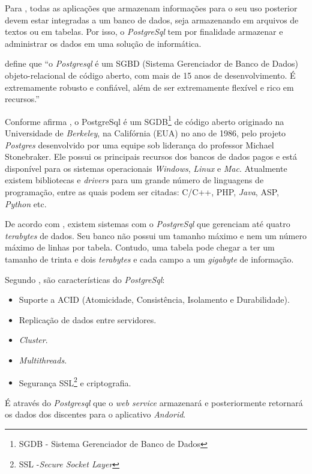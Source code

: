 
	\par Para , todas as aplicações que armazenam
informações para o seu uso posterior devem estar integradas a um banco de
dados, seja armazenando em arquivos de textos ou em tabelas. Por isso, o
\textit{PostgreSql} tem por finalidade armazenar e administrar os dados em uma
solução de informática.
	
	\par {} define que “o \textit{Postgresql} é
um SGBD (Sistema Gerenciador de Banco de Dados) objeto-relacional de código
aberto, com mais de 15 anos de desenvolvimento. É extremamente robusto e
confiável, além de ser extremamente flexível e rico em recursos.” 

	\par Conforme afirma , o PostgreSql é um
SGDB\footnote{SGDB - Sistema Gerenciador de Banco de Dados } de código aberto
originado na Universidade de \textit{Berkeley}, na Califórnia (EUA) no ano de
1986, pelo projeto \textit{Postgres} desenvolvido por uma equipe sob liderança
do professor Michael Stonebraker. Ele possui os principais recursos dos bancos
de dados pagos e está disponível para os sistemas operacionais
\textit{Windows}, \textit{Linux} e \textit{Mac}. Atualmente existem bibliotecas
e \textit{drivers} para um grande número de linguagens de programação, entre as
quais podem ser citadas: C/C++, PHP, \textit{Java}, ASP, \textit{Python} etc.

	\par De acordo com , existem sistemas com o
\textit{PostgreSql} que gerenciam até quatro \textit{terabytes} de dados. Seu
banco não possui um tamanho máximo e nem um número máximo de linhas por tabela.
Contudo, uma tabela pode chegar a ter um tamanho de trinta e dois
\textit{terabytes} e cada campo a um \textit{gigabyte} de informação.

	\par Segundo , são características do
\textit{PostgreSql}:

	\begin{itemize}
	  
	  \item Suporte a ACID (Atomicidade, Consistência, Isolamento e Durabilidade). 
	  
	  \item Replicação de dados entre servidores.
	  
	  \item \textit{Cluster}.
	  
	  \item \textit{Multithreads}.
	  
	  \item Segurança SSL\footnote{SSL -\textit{Secure Socket Layer}} e
	  criptografia.
	    
	\end{itemize}

	\par É através do \textit{Postgresql} que o \textit{web service} armazenará e
posteriormente retornará os dados dos discentes para o aplicativo
\textit{Andorid}.
